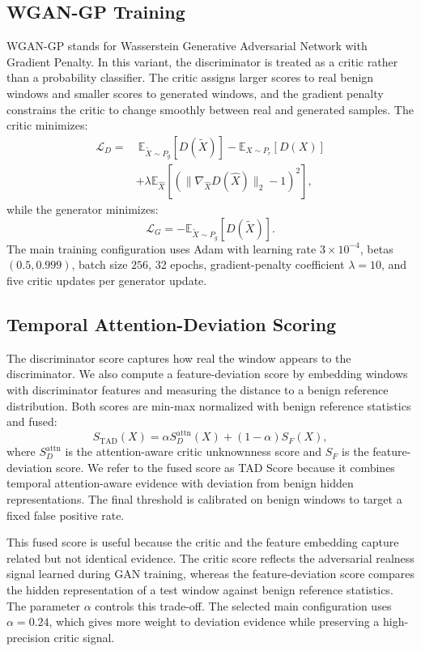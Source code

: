 \documentclass[conference]{IEEEtran}
\newcommand{\tad}{TAD Score}
\begin{document}
\subsection{WGAN-GP Training}
WGAN-GP stands for Wasserstein Generative Adversarial Network with Gradient Penalty. In this variant, the discriminator is treated as a critic rather than a probability classifier. The critic assigns larger scores to real benign windows and smaller scores to generated windows, and the gradient penalty constrains the critic to change smoothly between real and generated samples. The critic minimizes:
\begin{align}
  \mathcal{L}_D =
  &\ \mathbb{E}_{\tilde{X}\sim P_g}[D(\tilde{X})]
  - \mathbb{E}_{X\sim P_r}[D(X)] \nonumber\\
  &+ \lambda \mathbb{E}_{\hat{X}}
  [(\lVert \nabla_{\hat{X}} D(\hat{X}) \rVert_2 - 1)^2],
\end{align}
while the generator minimizes:
\begin{equation}
  \mathcal{L}_G = -\mathbb{E}_{\tilde{X}\sim P_g}[D(\tilde{X})].
\end{equation}
The main training configuration uses Adam with learning rate $3\times10^{-4}$, betas $(0.5,0.999)$, batch size $256$, 32 epochs, gradient-penalty coefficient $\lambda=10$, and five critic updates per generator update.

\subsection{Temporal Attention-Deviation Scoring}
The discriminator score captures how real the window appears to the discriminator. We also compute a feature-deviation score by embedding windows with discriminator features and measuring the distance to a benign reference distribution. Both scores are min-max normalized with benign reference statistics and fused:
\begin{equation}
  S_{\mathrm{TAD}}(X) = \alpha S_D^{\mathrm{attn}}(X) + (1-\alpha)S_F(X),
\end{equation}
where $S_D^{\mathrm{attn}}$ is the attention-aware critic unknownness score and $S_F$ is the feature-deviation score. We refer to the fused score as \tad{} because it combines temporal attention-aware evidence with deviation from benign hidden representations. The final threshold is calibrated on benign windows to target a fixed false positive rate.

This fused score is useful because the critic and the feature embedding capture related but not identical evidence. The critic score reflects the adversarial realness signal learned during GAN training, whereas the feature-deviation score compares the hidden representation of a test window against benign reference statistics. The parameter $\alpha$ controls this trade-off. The selected main configuration uses $\alpha=0.24$, which gives more weight to deviation evidence while preserving a high-precision critic signal.
\end{document}
